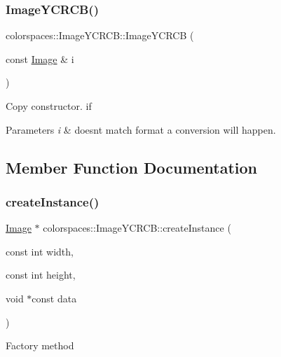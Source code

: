 \subsubsection{\texorpdfstring{Image\+Y\+C\+R\+C\+B()}{ImageYCRCB()}\hspace{0.1cm}{\footnotesize\ttfamily [3/3]}}
{\footnotesize\ttfamily colorspaces\+::\+Image\+Y\+C\+R\+C\+B\+::\+Image\+Y\+C\+R\+CB (\begin{DoxyParamCaption}\item[{const \hyperlink{classcolorspaces_1_1_image}{Image} \&}]{i }\end{DoxyParamCaption})}

Copy constructor. if 
\begin{DoxyParams}{Parameters}
{\em i} & doesn\textquotesingle{}t match format a conversion will happen. \\
\hline
\end{DoxyParams}


\subsection{Member Function Documentation}
\mbox{\label{classcolorspaces_1_1_image_y_c_r_c_b_ad2774884c1acea49b7c6799839763a02}} 
\subsubsection{\texorpdfstring{create\+Instance()}{createInstance()}}
{\footnotesize\ttfamily \hyperlink{classcolorspaces_1_1_image}{Image} $\ast$ colorspaces\+::\+Image\+Y\+C\+R\+C\+B\+::create\+Instance (\begin{DoxyParamCaption}\item[{const int}]{width,  }\item[{const int}]{height,  }\item[{void $\ast$const}]{data }\end{DoxyParamCaption})\hspace{0.3cm}{\ttfamily [static]}}

Factory method \mbox{\label{classcolorspaces_1_1_image_y_c_r_c_b_aae06774e3c6de95fdd0fc20d87eb1400}} 
